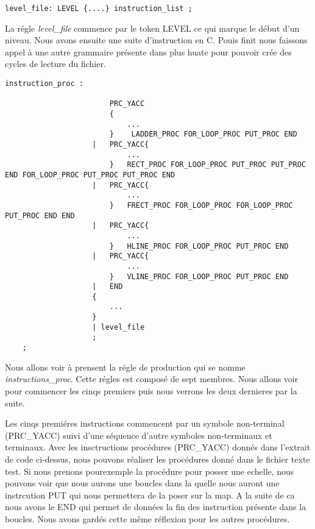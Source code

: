 \lstset{style=mystyle}
\begin{lstlisting}[caption=Lecture d'un niveau]
    level_file: LEVEL {....} instruction_list ;
\end{lstlisting}

La régle \textit{level\_file} commence par le token LEVEL ce qui marque le début d'un niveau. Nous avons ensuite une suite d'instruction en C. Pouis finit nous faissons appel à une autre grammaire présente dans plus huate pour pouvoir crée des cycles de lecture du fichier.

\lstset{style=mystyle}
\begin{lstlisting}[caption=Grammaire pour l'instruction d'une procédure]
    instruction_proc : 
                    
                        PRC_YACC
                        {
                            ...
                        }    LADDER_PROC FOR_LOOP_PROC PUT_PROC END
                    |   PRC_YACC{
                            ...
                        }   RECT_PROC FOR_LOOP_PROC PUT_PROC PUT_PROC END FOR_LOOP_PROC PUT_PROC PUT_PROC END
                    |   PRC_YACC{
                            ...
                        }   FRECT_PROC FOR_LOOP_PROC FOR_LOOP_PROC PUT_PROC END END
                    |   PRC_YACC{
                            ...
                        }   HLINE_PROC FOR_LOOP_PROC PUT_PROC END   
                    |   PRC_YACC{
                            ...
                        }   VLINE_PROC FOR_LOOP_PROC PUT_PROC END
                    |   END
                    {
                        ...
                    }
                    | level_file
                    ;
    ;
\end{lstlisting}

Nous allons voir à prensent la régle de production qui se nomme \textit{instructions\_proc}.
Cette régles est composé de sept membres. Nous allons voir pour commencer les cinqs premiers puis nous verrons les deux dernieres par la suite.

Les cinqs premiéres instructions commencent par un symbole non-terminal (PRC\_YACC) suivi d'une séquence d'autre symboles non-terminaux et terminaux.
Avec les insctructions procédures (PRC\_YACC) donnés dans l'extrait de code ci-dessus, nous pouvons réaliser les procédures donné dans le fichier texte test.
Si nous prenons pourexemple la procédure pour posser une echelle, nous pouvons voir que nous aurons une boucles dans la quelle nous auront une instrcution PUT qui nous permettera de la poser sur la map. A la suite de ca nous avons le END qui permet de données la fin des instruction présente dans la boucles.
Nous avons gardés cette même réflexion pour les autres procédures.

